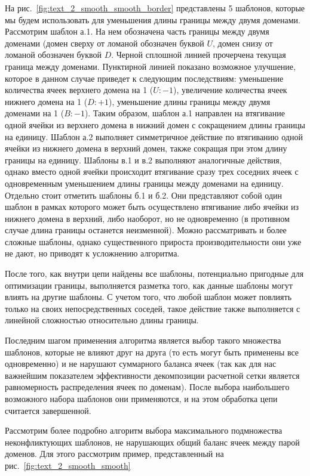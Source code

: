 На рис.~\ref{fig:text_2_smooth_smooth_border} представлены 5 шаблонов, которые мы будем использовать для уменьшения длины границы между двумя доменами.
Рассмотрим шаблон а.1.
На нем обозначена часть границы между двумя доменами (домен сверху от ломаной обозначен буквой $U$, домен снизу от ломаной обозначен буквой $D$.
Черной сплошной линией прочерчена текущая граница между доменами.
Пунктирной линией показано возможное улучшение, которое в данном случае приведет к следующим последствиям: уменьшение количества ячеек верхнего домена на 1 ($U: -1$), увеличение количества ячеек нижнего домена на 1 ($D: + 1$), уменьшение длины границы между двумя доменами на 1 ($B: -1$).
Таким образом, шаблон а.1 направлен на втягивание одной ячейки из верхнего домена в нижний домен с сокращением длины границы на единицу.
Шаблон а.2 выполняет симметричное действие по втягиванию одной ячейки из нижнего домена в верхний домен, также сокращая при этом длину границы на единицу.
Шаблоны в.1 и в.2 выполняют аналогичные действия, однако вместо одной ячейки происходит втягивание сразу трех соседних ячеек с одновременным уменьшением длины границы между доменами на единицу. Отдельно стоит отметить шаблоны б.1 и б.2.
Они представляют собой один шаблон в рамках которого может быть осуществлено втягивание либо ячейки из нижнего домена в верхний, либо наоборот, но не одновременно (в противном случае длина границы останется неизменной).
Можно рассматривать и более сложные шаблоны, однако существенного прироста производительности они уже не дают, но приводят к усложнению алгоритма.

После того, как внутри цепи найдены все шаблоны, потенциально пригодные для оптимизации границы, выполняется разметка того, как данные шаблоны могут влиять на другие шаблоны.
С учетом того, что любой шаблон может повлиять только на своих непосредственных соседей, такое действие также выполняется с линейной сложностью относительно длины границы.

Последним шагом применения алгоритма является выбор такого множества шаблонов, которые не влияют друг на друга (то есть могут быть применены все одновременно) и не нарушают суммарного баланса ячеек (так как для нас важнейшим показателем эффективности декомпозиции расчетной сетки является равномерность распределения ячеек по доменам).
После выбора наибольшего возможного набора шаблонов они применяются, и на этом обработка цепи считается завершенной.

Рассмотрим более подробно алгоритм выбора максимального подмножества неконфликтующих шаблонов, не нарушающих общий баланс ячеек между парой доменов.
Для этого рассмотрим пример, представленный на рис.~\ref{fig:text_2_smooth_smooth}

